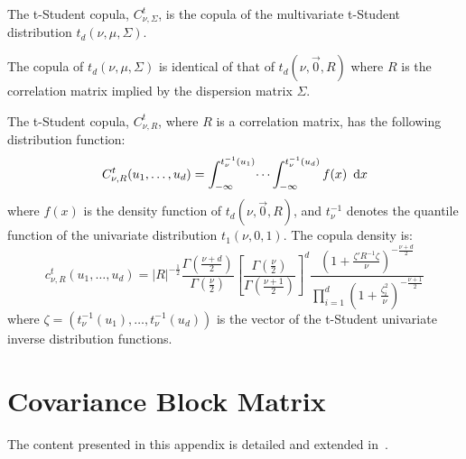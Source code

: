 \documentclass[11pt,fleqn]{book} %
\begin{document}
\begin{definition}
	The t-Student copula, $C_{\nu,\Sigma}^t$, is the copula of the multivariate 
	t-Student distribution $t_d(\nu,\mu,\Sigma)$.
\end{definition}

\begin{proposition}
	The copula of $t_d(\nu,\mu,\Sigma)$ is identical of that of $t_d(\nu,\vec{0},R)$
	where $R$ is the correlation matrix implied by the dispersion matrix $\Sigma$.
\end{proposition}

\begin{proposition}
	The t-Student copula, $C_{\nu,R}^t$, where $R$ is a correlation matrix,
	has the following distribution function:
	\begin{displaymath}
		C_{\nu,R}^t(u_1, \dots, u_d) = 
		\int_{-\infty}^{t_\nu^{-1}(u_1)} \dots \int_{-\infty}^{t_\nu^{-1}(u_d)} f(x)\ \mathop{\mathrm{{}d}}\mathopen{} x
	\end{displaymath}
	where $f(x)$ is the density function of $t_d(\nu,\vec{0},R)$, and $t_{\nu}^{-1}$ 
	denotes the quantile function of the univariate distribution $t_1(\nu,0,1)$. 
	The copula density is:
	\begin{displaymath}
		\label{eq:density}
		c_{\nu,R}^t(u_1,\dots,u_d) =
		|R|^{-\frac{1}{2}} 
		\displaystyle\frac{\Gamma{\left(\frac{\nu+d}{2}\right)}}{\Gamma{\left(\frac{\nu}{2}\right)}}
		\displaystyle\left[ \frac{\Gamma{\left(\frac{\nu}{2}\right)}}{\Gamma{\left(\frac{\nu+1}{2}\right)}} \right]^d
		\frac{\displaystyle\left( 1+\frac{\zeta' R^{-1} \zeta}{\nu}\right)^{-\frac{\nu+d}{2}}}{\displaystyle\prod_{i=1}^d \left( 1+\frac{\zeta_i^2}{\nu} \right)^{-\frac{\nu+1}{2}}}
	\end{displaymath}
	\noindent
	where $\zeta=(t_\nu^{-1}(u_1), \dots, t_\nu^{-1}(u_d))$ is the vector of 
	the t-Student univariate inverse distribution functions.
\end{proposition}

\section{Covariance Block Matrix}
\label{ap:cbm}

The content presented in this appendix is detailed and extended 
in~\cite{torrent:2012}.
\end{document}
